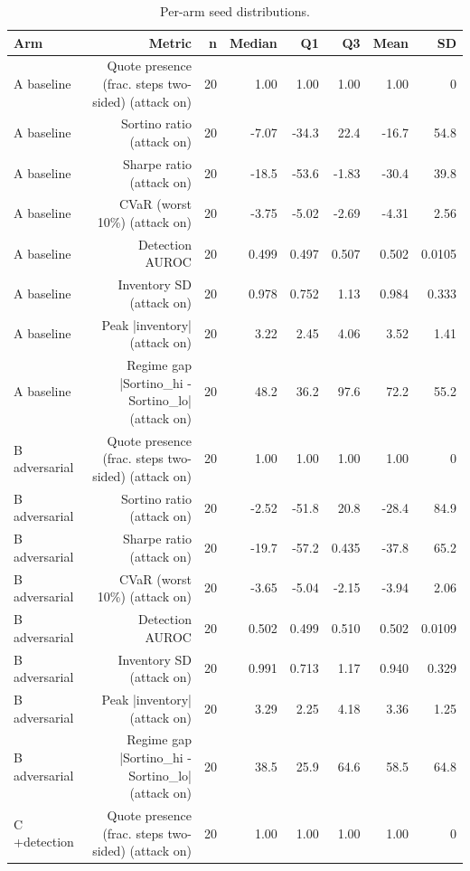 \begin{table}[htbp]
  \centering
  \caption{Per-arm seed distributions.}
  \label{tab:summary}
  \begin{tabular}{lrrrrrrr}
    \toprule
    Arm & Metric & n & Median & Q1 & Q3 & Mean & SD \\
    \midrule
    A  baseline & Quote presence (frac. steps two-sided) (attack on) & 20 & 1.00 & 1.00 & 1.00 & 1.00 & 0 \\
    A  baseline & Sortino ratio (attack on) & 20 & -7.07 & -34.3 & 22.4 & -16.7 & 54.8 \\
    A  baseline & Sharpe ratio (attack on) & 20 & -18.5 & -53.6 & -1.83 & -30.4 & 39.8 \\
    A  baseline & CVaR (worst 10\%) (attack on) & 20 & -3.75 & -5.02 & -2.69 & -4.31 & 2.56 \\
    A  baseline & Detection AUROC & 20 & 0.499 & 0.497 & 0.507 & 0.502 & 0.0105 \\
    A  baseline & Inventory SD (attack on) & 20 & 0.978 & 0.752 & 1.13 & 0.984 & 0.333 \\
    A  baseline & Peak |inventory| (attack on) & 20 & 3.22 & 2.45 & 4.06 & 3.52 & 1.41 \\
    A  baseline & Regime gap  |Sortino\_hi - Sortino\_lo| (attack on) & 20 & 48.2 & 36.2 & 97.6 & 72.2 & 55.2 \\
    B  adversarial & Quote presence (frac. steps two-sided) (attack on) & 20 & 1.00 & 1.00 & 1.00 & 1.00 & 0 \\
    B  adversarial & Sortino ratio (attack on) & 20 & -2.52 & -51.8 & 20.8 & -28.4 & 84.9 \\
    B  adversarial & Sharpe ratio (attack on) & 20 & -19.7 & -57.2 & 0.435 & -37.8 & 65.2 \\
    B  adversarial & CVaR (worst 10\%) (attack on) & 20 & -3.65 & -5.04 & -2.15 & -3.94 & 2.06 \\
    B  adversarial & Detection AUROC & 20 & 0.502 & 0.499 & 0.510 & 0.502 & 0.0109 \\
    B  adversarial & Inventory SD (attack on) & 20 & 0.991 & 0.713 & 1.17 & 0.940 & 0.329 \\
    B  adversarial & Peak |inventory| (attack on) & 20 & 3.29 & 2.25 & 4.18 & 3.36 & 1.25 \\
    B  adversarial & Regime gap  |Sortino\_hi - Sortino\_lo| (attack on) & 20 & 38.5 & 25.9 & 64.6 & 58.5 & 64.8 \\
    C  +detection & Quote presence (frac. steps two-sided) (attack on) & 20 & 1.00 & 1.00 & 1.00 & 1.00 & 0 \\

\end{tabular}
\end{table}
